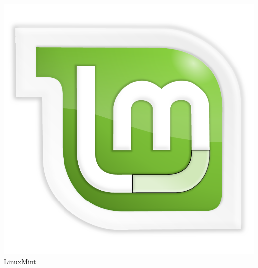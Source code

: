 \documentclass{beamer}
\begin{document}
\begin{frame}
\begin{minipage}[b][.35\textheight][t]{.3\textwidth}
    \includegraphics[width=.7\textwidth]{img/logo-linuxmint.pdf}\\
    \centering
    LinuxMint
    \end{minipage}\\[0.5em]


\end{frame}
\end{document}
